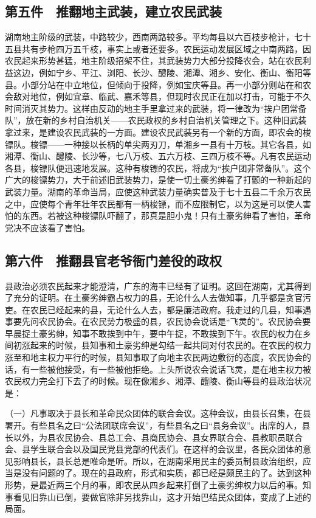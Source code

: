 \subsection*{第五件　推翻地主武装，建立农民武装}

湖南地主阶级的武装，中路较少，西南两路较多。平均每县以六百枝步枪计，七十五县共有步枪四万五千枝，事实上或者还要多。农民运动发展区域之中南两路，因农民起来形势甚猛，地主阶级招架不住，其武装势力大部分投降农会，站在农民利益这边，例如宁乡、平江、浏阳、长沙、醴陵、湘潭、湘乡、安化、衡山、衡阳等县。小部分站在中立地位，但倾向于投降，例如宝庆等县。再一小部分则站在和农会敌对地位，例如宜章、临武、嘉禾等县，但现时农民正在加以打击，可能于不久时间消灭其势力。这样由反动的地主手里拿过来的武装，将一律改为“挨户团常备队”，放在新的乡村自治机关——农民政权的乡村自治机关管理之下。这种旧武装拿过来，是建设农民武装的一方面。建设农民武装另有一个新的方面，即农会的梭镖队。梭镖——一种接以长柄的单尖两刃刀，单湘乡一县有十万枝。其它各县，如湘潭、衡山、醴陵、长沙等，七八万枝、五六万枝、三四万枝不等。凡有农民运动各县，梭镖队便迅速地发展。这种有梭镖的农民，将成为“挨户团非常备队”。这个广大的梭镖势力，大于前述旧武装势力，是使一切土豪劣绅看了打颤的一种新起的武装力量。湖南的革命当局，应使这种武装力量确实普及于七十五县二千余万农民之中，应使每个青年壮年农民都有一柄梭镖，而不应限制它，以为这是可以使人害怕的东西。若被这种梭镖队吓翻了，那真是胆小鬼！只有土豪劣绅看了害怕，革命党决不应该看了害怕。

\subsection*{第六件　推翻县官老爷衙门差役的政权}

县政治必须农民起来才能澄清，广东的海丰已经有了证明。这回在湖南，尤其得到了充分的证明。在土豪劣绅霸占权力的县，无论什么人去做知事，几乎都是贪官污吏。在农民已经起来的县，无论什么人去，都是廉洁政府。我走过的几县，知事遇事要先问农民协会。在农民势力极盛的县，农民协会说话是“飞灵的”。农民协会要早晨捉土豪劣绅，知事不敢挨到中午，要中午捉，不敢挨到下午。农民的权力在乡间初涨起来的时候，县知事和土豪劣绅是勾结一起共同对付农民的。在农民的权力涨至和地主权力平行的时候，县知事取了向地主农民两边敷衍的态度，农民协会的话，有一些被他接受，有一些被他拒绝。上头所说农会说话飞灵，是在地主权力被农民权力完全打下去了的时候。现在像湘乡、湘潭、醴陵、衡山等县的县政治状况是：

（一）凡事取决于县长和革命民众团体的联合会议。这种会议，由县长召集，在县署开。有些县名之曰“公法团联席会议”，有些县名之曰“县务会议”。出席的人，县长以外，为县农民协会、县总工会、县商民协会、县女界联合会、县教职员联合会、县学生联合会以及国民党县党部的代表们。在这样的会议里，各民众团体的意见影响县长，县长总是唯命是听。所以，在湖南采用民主的委员制县政治组织，应当是没有问题的了。现在的县政府，形式和实质，都已经是颇民主的了。达到这种形势，是最近两三个月的事，即农民从四乡起来打倒了土豪劣绅权力以后的事。知事看见旧靠山已倒，要做官除非另找靠山，这才开始巴结民众团体，变成了上述的局面。

